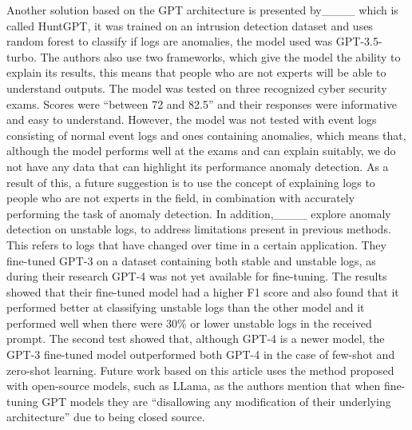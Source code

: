 Another solution based on the GPT architecture is presented by____ which is called HuntGPT, it was trained on an intrusion detection dataset and uses random forest to classify if logs are anomalies, the model used was GPT-3.5-turbo. The authors also use two frameworks, which give the model the ability to explain its results, this means that people who are not experts will be able to understand outputs. The model was tested on three recognized cyber security exams. Scores were ``between 72 and 82.5'' and their responses were informative and easy to understand. However, the model was not tested with event logs consisting of normal event logs and ones containing anomalies, which means that, although the model performs well at the exams and can explain suitably, we do not have any data that can highlight its performance anomaly detection. As a result of this, a future suggestion is to use the concept of explaining logs to people who are not experts in the field, in combination with accurately performing the task of anomaly detection. In addition,____ explore anomaly detection on unstable logs, to address limitations present in previous methods. This refers to logs that have changed over time in a certain application. They fine-tuned GPT-3 on a dataset containing both stable and unstable logs, as during their research GPT-4 was not yet available for fine-tuning. The results showed that their fine-tuned model had a higher F1 score and also found that it performed better at classifying unstable logs than the other model and it performed well when there were 30\% or lower unstable logs in the received prompt. The second test showed that, although GPT-4 is a newer model, the GPT-3 fine-tuned model outperformed both GPT-4 in the case of few-shot and zero-shot learning. Future work based on this article uses the method proposed with open-source models, such as LLama, as the authors mention that when fine-tuning GPT models they are ``disallowing any modification of their underlying architecture'' due to being closed source.

